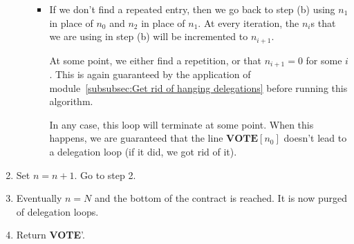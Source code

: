 \documentclass[submission, copyright,creativecommons,sharealike,noncommercial]{eptcs}
\newcommand{\Vote}{\textbf{VOTE}\xspace}
\begin{document}
\begin{enumerate}
\begin{enumerate}
\begin{itemize}
				\item If we don't find a repeated entry, then we go back to step (b) using $n_1$ in place of $n_0$ and $n_2$ in place of $n_1$. At every iteration, the $n_i$s that we are using in step (b) will be incremented to $n_{i+1}$. 
				
				At some point, we either find a repetition, or that $n_{i+1} = 0$ for some $i$. This is again guaranteed by the application of module~\ref{subsubsec:Get rid of hanging delegations} before running this algorithm.
				
				In any case, this loop will terminate at some point. When this happens, we are guaranteed that the line $\Vote[n_0]$ doesn't lead to a delegation loop (if it did, we got rid of it).
			\end{itemize} 
		\end{enumerate}
		\item Set $n = n+1$. Go to step 2.
		\item Eventually $n = N$ and the bottom of the contract is reached. It is now purged of delegation loops.
		\item Return \Vote'.
		
	\end{enumerate}
\end{document}
